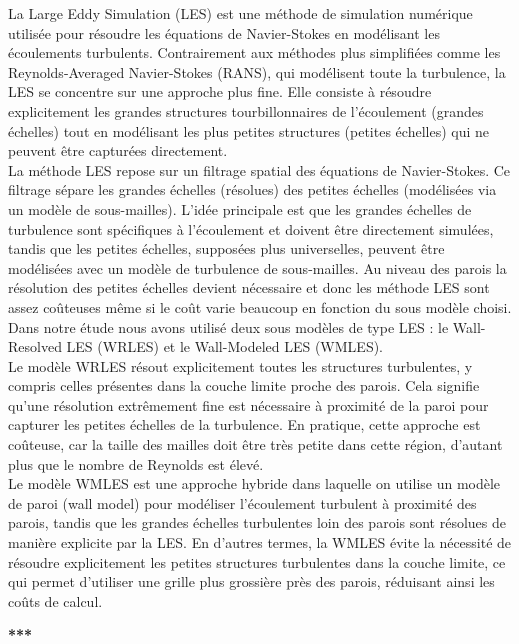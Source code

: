 \documentclass[12pt]{article}   %
\theoremstyle{plain}
\theoremstyle{remark}
\begin{document}
La Large Eddy Simulation (LES) est une méthode de simulation numérique utilisée pour résoudre les équations de Navier-Stokes en modélisant les écoulements turbulents. Contrairement aux méthodes plus simplifiées comme les Reynolds-Averaged Navier-Stokes (RANS), qui modélisent toute la turbulence, la LES se concentre sur une approche plus fine. Elle consiste à résoudre explicitement les grandes structures tourbillonnaires de l’écoulement (grandes échelles) tout en modélisant les plus petites structures (petites échelles) qui ne peuvent être capturées directement. \\
La méthode LES repose sur un filtrage spatial des équations de Navier-Stokes. Ce filtrage sépare les grandes échelles (résolues) des petites échelles (modélisées via un modèle de sous-mailles). L’idée principale est que les grandes échelles de turbulence sont spécifiques à l’écoulement et doivent être directement simulées, tandis que les petites échelles, supposées plus universelles, peuvent être modélisées avec un modèle de turbulence de sous-mailles. Au niveau des parois la résolution des petites échelles devient nécessaire et donc les méthode LES sont assez coûteuses même si le coût varie beaucoup en fonction du sous modèle choisi. \\

Dans notre étude nous avons utilisé deux sous modèles de type LES : le Wall-Resolved LES (WRLES) et le Wall-Modeled LES (WMLES). \\
Le modèle WRLES résout explicitement toutes les structures turbulentes, y compris celles présentes dans la couche limite proche des parois. Cela signifie qu’une résolution extrêmement fine est nécessaire à proximité de la paroi pour capturer les petites échelles de la turbulence. En pratique, cette approche est coûteuse, car la taille des mailles doit être très petite dans cette région, d’autant plus que le nombre de Reynolds est élevé. \\
Le modèle WMLES est une approche hybride dans laquelle on utilise un modèle de paroi (wall model) pour modéliser l’écoulement turbulent à proximité des parois, tandis que les grandes échelles turbulentes loin des parois sont résolues de manière explicite par la LES. En d'autres termes, la WMLES évite la nécessité de résoudre explicitement les petites structures turbulentes dans la couche limite, ce qui permet d'utiliser une grille plus grossière près des parois, réduisant ainsi les coûts de calcul.

\begin{center}
	\large \bf{***}
\end{center}
\end{document}
